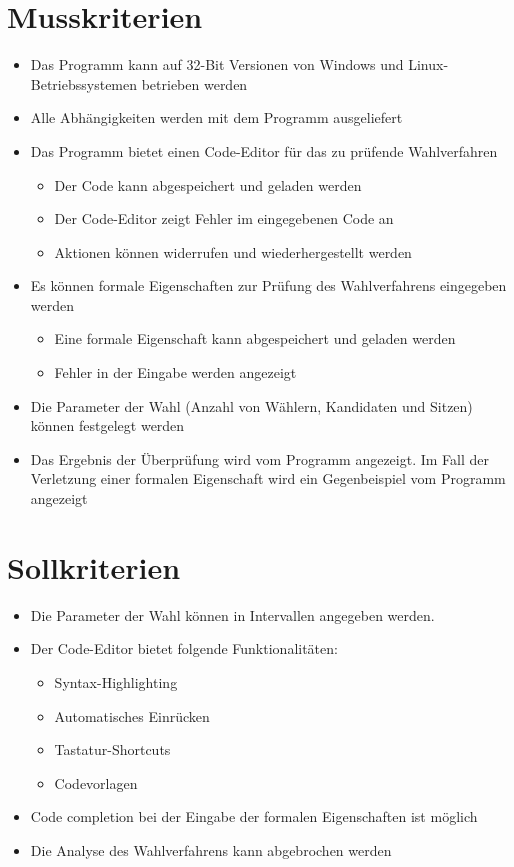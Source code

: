 \documentclass[a4paper]{scrreprt}
\begin{document}
\section{Musskriterien}
\begin{itemize}
\item Das Programm kann auf 32-Bit Versionen von Windows und Linux-Betriebssystemen betrieben werden
\item Alle Abhängigkeiten werden mit dem Programm ausgeliefert
\item Das Programm bietet einen Code-Editor für das zu prüfende Wahlverfahren
	\begin{itemize}
	\item Der Code kann abgespeichert und geladen werden
	\item Der Code-Editor zeigt Fehler im eingegebenen Code an
	\item Aktionen können widerrufen und wiederhergestellt werden
	\end{itemize}
\item Es können formale Eigenschaften zur Prüfung des Wahlverfahrens eingegeben werden
	\begin{itemize}
	\item Eine formale Eigenschaft kann abgespeichert und geladen werden	
	\item Fehler in der Eingabe werden angezeigt
	\end{itemize}
\item Die Parameter der Wahl (Anzahl von Wählern, Kandidaten und Sitzen) können festgelegt werden
\item Das Ergebnis der Überprüfung wird vom Programm angezeigt. Im Fall der Verletzung einer formalen Eigenschaft wird ein Gegenbeispiel vom Programm angezeigt
\end{itemize}


\section{Sollkriterien}
\begin{itemize}
\item Die Parameter der Wahl können in Intervallen angegeben werden.
\item Der Code-Editor bietet folgende Funktionalitäten:
	\begin{itemize}
	\item Syntax-Highlighting
	\item Automatisches Einrücken
	\item Tastatur-Shortcuts
	\item Codevorlagen
	\end{itemize}
\item Code completion bei der Eingabe der formalen Eigenschaften ist möglich
\item Die Analyse des Wahlverfahrens kann abgebrochen werden
\end{itemize}
\end{document}
